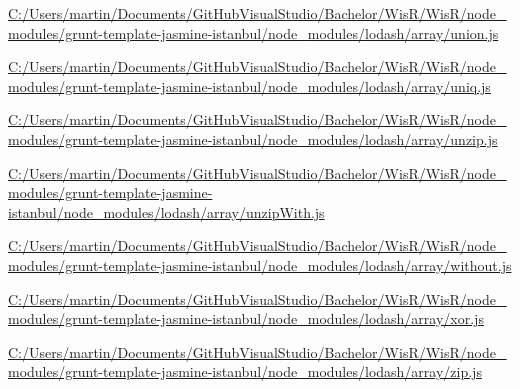 \begin{DoxyCompactItemize}
\item 
\hyperlink{_c_1_2_users_2martin_2_documents_2_git_hub_visual_studio_2_bachelor_2_wis_r_2_wis_r_2node_module1b58692789d2d8152ac823357bccfea3}{C\+:/\+Users/martin/\+Documents/\+Git\+Hub\+Visual\+Studio/\+Bachelor/\+Wis\+R/\+Wis\+R/node\+\_\+modules/grunt-\/template-\/jasmine-\/istanbul/node\+\_\+modules/lodash/array/union.\+js}
\item 
\hyperlink{_c_1_2_users_2martin_2_documents_2_git_hub_visual_studio_2_bachelor_2_wis_r_2_wis_r_2node_modulef0dc6bc52ffa11e6f21b0ddb9890f3a2}{C\+:/\+Users/martin/\+Documents/\+Git\+Hub\+Visual\+Studio/\+Bachelor/\+Wis\+R/\+Wis\+R/node\+\_\+modules/grunt-\/template-\/jasmine-\/istanbul/node\+\_\+modules/lodash/array/uniq.\+js}
\item 
\hyperlink{_c_1_2_users_2martin_2_documents_2_git_hub_visual_studio_2_bachelor_2_wis_r_2_wis_r_2node_module612e27692c25de897e58c7126c92a00c}{C\+:/\+Users/martin/\+Documents/\+Git\+Hub\+Visual\+Studio/\+Bachelor/\+Wis\+R/\+Wis\+R/node\+\_\+modules/grunt-\/template-\/jasmine-\/istanbul/node\+\_\+modules/lodash/array/unzip.\+js}
\item 
\hyperlink{_c_1_2_users_2martin_2_documents_2_git_hub_visual_studio_2_bachelor_2_wis_r_2_wis_r_2node_modulefda2a0743cceb0c8a04ae7ff361f73b5}{C\+:/\+Users/martin/\+Documents/\+Git\+Hub\+Visual\+Studio/\+Bachelor/\+Wis\+R/\+Wis\+R/node\+\_\+modules/grunt-\/template-\/jasmine-\/istanbul/node\+\_\+modules/lodash/array/unzip\+With.\+js}
\item 
\hyperlink{_c_1_2_users_2martin_2_documents_2_git_hub_visual_studio_2_bachelor_2_wis_r_2_wis_r_2node_module6e05e935285ae75bc532e6bfdba1238b}{C\+:/\+Users/martin/\+Documents/\+Git\+Hub\+Visual\+Studio/\+Bachelor/\+Wis\+R/\+Wis\+R/node\+\_\+modules/grunt-\/template-\/jasmine-\/istanbul/node\+\_\+modules/lodash/array/without.\+js}
\item 
\hyperlink{_c_1_2_users_2martin_2_documents_2_git_hub_visual_studio_2_bachelor_2_wis_r_2_wis_r_2node_module4fd1ddd143bee8aa509d850492959df0}{C\+:/\+Users/martin/\+Documents/\+Git\+Hub\+Visual\+Studio/\+Bachelor/\+Wis\+R/\+Wis\+R/node\+\_\+modules/grunt-\/template-\/jasmine-\/istanbul/node\+\_\+modules/lodash/array/xor.\+js}
\item 
\hyperlink{_c_1_2_users_2martin_2_documents_2_git_hub_visual_studio_2_bachelor_2_wis_r_2_wis_r_2node_modulefc81b79eaf04ebbd0dcb8732b5030b46}{C\+:/\+Users/martin/\+Documents/\+Git\+Hub\+Visual\+Studio/\+Bachelor/\+Wis\+R/\+Wis\+R/node\+\_\+modules/grunt-\/template-\/jasmine-\/istanbul/node\+\_\+modules/lodash/array/zip.\+js}

\end{DoxyCompactItemize}
